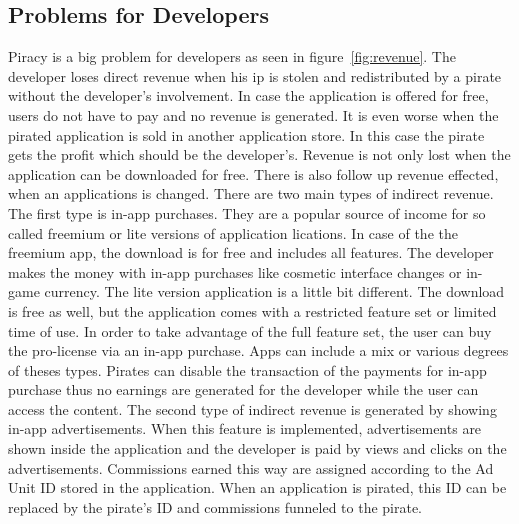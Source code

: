 \subsection{Problems for Developers} \label{subsection:foundation-piracy-developers}
Piracy is a big problem for developers as seen in figure~\ref{fig:revenue}.
The developer loses direct revenue when his \gls{ip} is stolen and redistributed by a pirate without the developer's involvement.
In case the application is offered for free, users do not have to pay and no revenue is generated.
It is even worse when the pirated application is sold in another application store.
In this case the pirate gets the profit which should be the developer's.
\newline
Revenue is not only lost when the application can be downloaded for free.
There is also follow up revenue effected, when an applications is changed.
There are two main types of indirect revenue.
\newline
The first type is in-app purchases.
They are a popular source of income for so called freemium or lite versions of  application lications.
In case of the the freemium app, the download is for free and includes all features.
The developer makes the money with in-app purchases like cosmetic interface changes or in-game currency.
The lite version application is a little bit different.
The download is free as well, but the application comes with a restricted feature set or limited time of use.
In order to take advantage of the full feature set, the user can buy the pro-license via an in-app purchase.
\newpage
Apps can include a mix or various degrees of theses types.
Pirates can disable the transaction of the payments for in-app purchase thus no earnings are generated for the developer while the user can access the content.
\newline
The second type of indirect revenue is generated by showing in-app advertisements.
When this feature is implemented, advertisements are shown inside the application and the developer is paid by views and clicks on the advertisements.
Commissions earned this way are assigned according to the Ad Unit ID \cite{googleAdmob} stored in the application.
When an application is pirated, this ID can be replaced by the pirate's ID and commissions funneled to the pirate.
\newline
